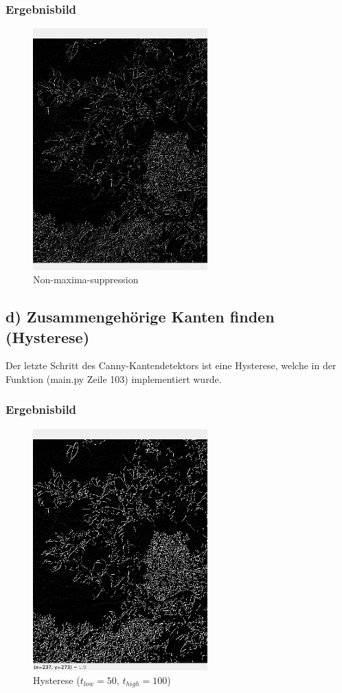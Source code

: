 \documentclass[12pt]{article}
\begin{document}
\subsubsection*{Ergebnisbild}
\begin{figure}[H]
  \centering
  \includegraphics[width=0.6\textwidth, keepaspectratio]{suppressed.png}\\
  Non-maxima-suppression
\end{figure}

\newpage

\subsection*{d) Zusammengehörige Kanten finden (Hysterese)}
Der letzte Schritt des Canny-Kantendetektors ist eine Hysterese, welche in der Funktion \textbf{} (main.py Zeile 103) implementiert wurde.

\subsubsection*{Ergebnisbild}
\begin{figure}[H]
  \centering
  \includegraphics[width=0.6\textwidth, keepaspectratio]{hysteresis.png}\\
  Hysterese ($t_{low} = 50$, $t_{high} = 100$)
\end{figure}
\end{document}
